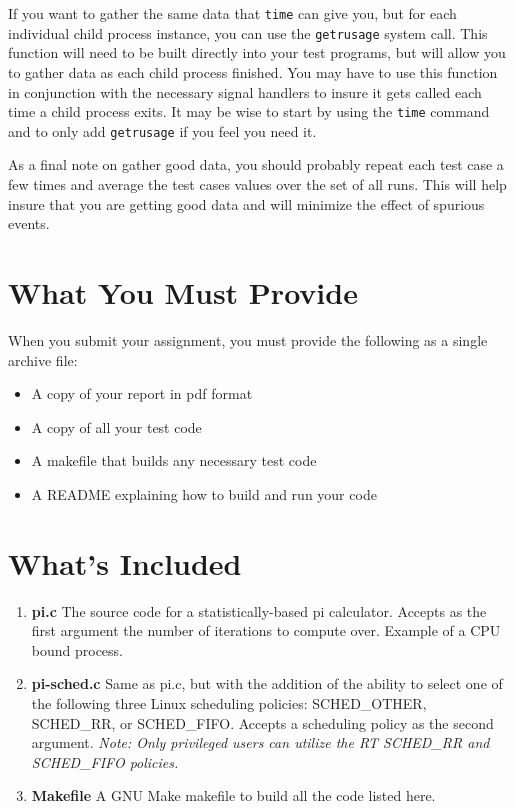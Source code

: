 \documentclass[12pt]{article}
\begin{document}
If you want to gather the same data that \texttt{time} can give you,
but for each individual child process instance, you can use the
\texttt{getrusage} system call. This function will need to be built
directly into your test programs, but will allow you to gather data as
each child process finished. You may have to use this function in
conjunction with the necessary signal handlers to insure it gets
called each time a child process exits. It may be wise to start by
using the \texttt{time} command and to only add \texttt{getrusage} if
you feel you need it.

As a final note on gather good data, you should probably repeat each
test case a few times and average the test cases values over the set
of all runs. This will help insure that you are getting good data and
will minimize the effect of spurious events.

\section{What You Must Provide}

When you submit your assignment, you must provide the following as a
single archive file:
\begin{itemize}
\item A copy of your report in pdf format
\item A copy of all your test code
\item A makefile that builds any necessary test code
\item A README explaining how to build and run your code
\end{itemize}

\section{What's Included}

\begin{enumerate}

\item {\bf pi.c} The source code for a statistically-based pi
  calculator. Accepts as the first argument the number of iterations to
  compute over. Example of a CPU bound process.

\item {\bf pi-sched.c} Same as pi.c, but with the addition of the
  ability to select one of the following three Linux scheduling
  policies: SCHED\_OTHER, SCHED\_RR, or SCHED\_FIFO. Accepts a scheduling
  policy as the second argument. \emph{Note: Only privileged users can
  utilize the RT SCHED\_RR and SCHED\_FIFO policies.}

\item {\bf Makefile} A GNU Make makefile to build all the code listed
  here.

\end{enumerate}
\end{document}
